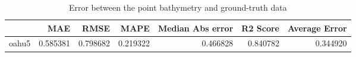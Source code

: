 \begin{table}[h!]
\caption{Error between the point bathymetry and ground-truth data}
\label{tab:oahu5_lidar_error}
\begin{tabular}{lrrrrrr}
\toprule
 & MAE & RMSE & MAPE & Median Abs error & R2 Score & Average Error \\
\midrule
oahu5 & 0.585381 & 0.798682 & 0.219322 & 0.466828 & 0.840782 & 0.344920 \\
\bottomrule
\end{tabular}
\end{table}

